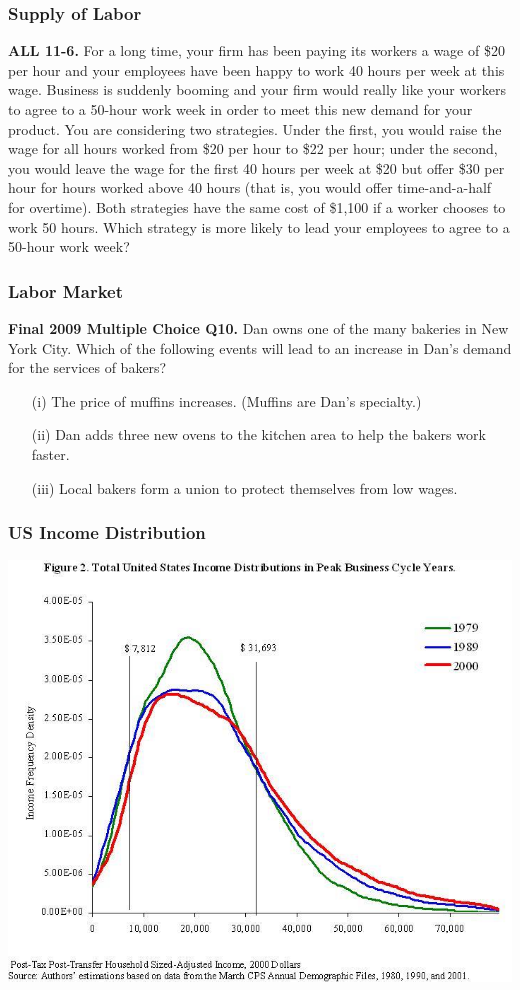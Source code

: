 \documentclass[12pt, xcolor=dvipsnames]{beamer}
\begin{document}
\begin{frame}
\frametitle{\bf Supply of Labor}
\small \textsf{\bfseries ALL 11-6.} 
For a long time, your firm has been paying its workers a wage of \$20 per hour and your employees have been happy to work 40 hours per week at this wage. Business is suddenly booming and your firm would really like your workers to agree to a 50-hour work week in order to meet this new demand for your product. You are considering two strategies. Under the first, you would raise the wage for all hours worked from \$20 per hour to \$22 per hour; under the second, you would leave the wage for the first 40 hours per week at \$20 but offer \$30 per hour for hours worked above 40 hours (that is, you would offer time-and-a-half for overtime). Both strategies have the same cost of \$1,100 if a worker chooses to work 50 hours. Which strategy is more likely to lead your employees to agree to a 50-hour work week?
\end{frame}


\begin{frame}
\frametitle{\bf Labor Market}
\small \textsf{\bfseries Final 2009 Multiple Choice Q10.} 
Dan owns one of the many bakeries in New York City. Which of the following events will lead to an increase in Dan's demand for the services of bakers?
\begin{enumerate}\itemsep-0.5ex
\item[(i)] The price of muffins increases. (Muffins are Dan's specialty.)
\item[(ii)] Dan adds three new ovens to the kitchen area to help the bakers work faster.
\item[(iii)] Local bakers form a union to protect themselves from low wages.
\end{enumerate}
\end{frame}


\begin{frame}
\frametitle{\bf US Income Distribution}
\begin{center}
\includegraphics[height=.85\textheight]{figures/dist.jpg}
\end{center}
\end{frame}
\end{document}
